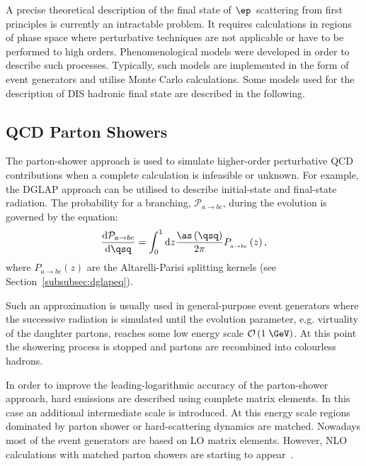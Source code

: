 A precise theoretical description of the final state of $\ep$~scattering from first principles is currently an intractable problem. It requires calculations in regions of phase space where perturbative techniques are not applicable or have to be performed to high orders. Phenomenological models were developed in order to describe such processes. Typically, such models are implemented in the form of event generators and utilise Monte Carlo calculations. Some models used for the description of DIS hadronic final state are described in the following.
\subsection{QCD Parton Showers}
\label{sec:qcdpartonshower}
The parton-shower approach is used to simulate higher-order perturbative QCD contributions when a complete calculation is infeasible or unknown. For example, the DGLAP approach can be utilised to describe initial-state and final-state radiation. The probability for a branching, $\mathcal{P}_{a\rightarrow bc}$, during the evolution is governed by the equation:
\begin{equation}
\frac{\mathrm{d}\mathcal{P}_{a\rightarrow bc}}{\mathrm{d}\qsq} = \int_0^1{\mathrm{d}z\frac{\as\left(\qsq\right)}{2\pi}P_{_{a\rightarrow bc}}}\left(z\right),
\end{equation}
where $P_{a\rightarrow bc}\left(z\right)$ are the Altarelli-Parisi splitting kernels (see Section~\ref{subsubsec:dglapeq}).

Such an approximation is usually used in general-purpose event generators where the successive radiation is simulated until the evolution parameter, e.g. virtuality of the daughter partons, reaches some low energy scale $\mathcal{O}\left(1\;\GeV\right)$. At this point the showering process is stopped and partons are recombined into colourless hadrons.

In order to improve the leading-logarithmic accuracy of the parton-shower approach, hard emissions are described using complete matrix elements. In this case an additional intermediate scale is introduced. At this energy scale regions dominated by parton shower or hard-scattering dynamics are matched. Nowadays most of the event generators are based on LO matrix elements. However, NLO calculations with matched parton showers are starting to appear~\cite{Frixione:2007vw,Frixione:2002ik}.

